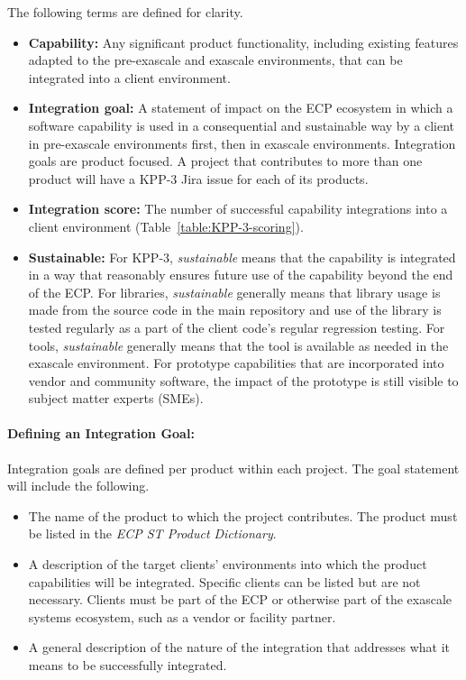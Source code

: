 The following terms are defined for clarity.
\begin{itemize}
	\item \textbf{Capability:} Any significant product functionality, including existing features adapted to the pre-exascale and exascale environments, that can be integrated into a client environment.
	\item \textbf{Integration goal:} A statement of impact on the ECP ecosystem in which a software capability is used in a consequential and sustainable way by a client in pre-exascale environments first, then in exascale environments.  Integration goals are product focused.  A project that contributes to more than one product will have a KPP-3 Jira issue for each of its products.
	\item \textbf{Integration score: }The number of successful capability integrations into a client environment (Table~\ref{table:KPP-3-scoring}).
	\item \textbf{Sustainable:} For KPP-3, \textit{sustainable} means that the capability is integrated in a way that reasonably ensures future use of the capability beyond the end of the ECP.  For libraries, \textit{sustainable} generally means that library usage is made from the source code in the main repository and use of the library is tested regularly as a part of the client code's regular regression testing.  For tools, \textit{sustainable} generally means that the tool is available as needed in the exascale environment.  For prototype capabilities that are incorporated into vendor and community software, the impact of the prototype is still visible to subject matter experts (SMEs).
\end{itemize}

\paragraph{Defining an Integration Goal:}
Integration goals are defined per product within each project.  The goal statement will include the following.
\begin{itemize}
	\item The name of the product to which the project contributes.  The product must be listed in the \textit{ECP ST Product Dictionary}.
	\item A description of the target clients' environments into which the product capabilities will be integrated.  Specific clients can be listed but are not necessary.  Clients must be part of the ECP or otherwise part of the exascale systems ecosystem, such as a vendor or facility partner.   
	\item A general description of the nature of the integration that addresses what it means to be successfully integrated.
\end{itemize}

